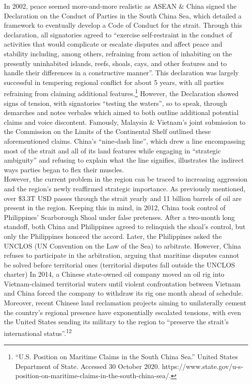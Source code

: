 \documentclass[10pt, letterpaper]{article}
\begin{document}
 In 2002, peace seemed more-and-more realistic as ASEAN \& China
signed the Declaration on the Conduct of Parties in the South China Sea,
which detailed a framework to eventually develop a Code of Conduct for
the strait. Through this declaration, all signatories agreed to
``exercise self-restraint in the conduct of activities that would
complicate or escalate disputes and affect peace and stability
including, among others, refraining from action of inhabiting on the
presently uninhabited islands, reefs, shoals, cays, and other features
and to handle their differences in a constructive manner''. This
declaration was largely successful in tempering regional conflict for
about 5 years, with all parties refraining from claiming additional
features.\footnote{``U.S. Position on Maritime Claims in the South China
  Sea.'' United States Department of State. Accessed 30 October 2020.
  https://www.state.gov/u-s-position-on-maritime-claims-in-the-south-china-sea/.}
However, the Declaration showed signs of tension, with signatories
``testing the waters'', so to speak, through demarches and notes
verbales which aimed to both outline additional potential claims and
voice discontent. Famously, Malaysia \& Vietnam's joint submission to
the Commission on the Limits of the Continental Shelf outlined these
aforementioned claims. China's ``nine-dash line'', which drew a line
encompassing most of the strait and all of its land features while
engaging in ``strategic ambiguity'' and refusing to explain what the
line signifies, illustrates the indirect ways parties began to flex
their muscles. \\

 However, the current problem in the region can be traced to
increasing aggression and the region's newly reaffirmed strategic
importance. As previously mentioned, over \$3.3T USD passes through the
strait yearly and 11 billion barrels of oil are present in the region.
Keeping this in mind, in 2012, China took control of Philippines'
Scarborough Shoal under false pretenses. After a two-month long
standoff, both China and Philippines agreed to relinquish the shoal's
control, but only the Philippines honored the accord. Later, the
Philippines asked the UNCLOS (UN Convention on the Law of the Sea) to
arbitrate. However, China refuses to participate in the arbitration,
arguing that maritime disputes cannot be solved before territorial ones
(territorial disputes fall outside the UNCLOS charter) In 2014, a
Chinese state-owned oil company moved an oil rig into Vietnam-claimed
territorial waters until violent confrontation between Vietnam and China
forced the company to withdraw its rig one month ahead of schedule.
Moreover, recent Chinese land reclamation projects aiming to
unilaterally cement the country's regional presence have exponentially
escalated tensions, with even the United States sending its military to
the region to ``preserve the strait's international
status''.\textsuperscript{12} \\
\end{document}
